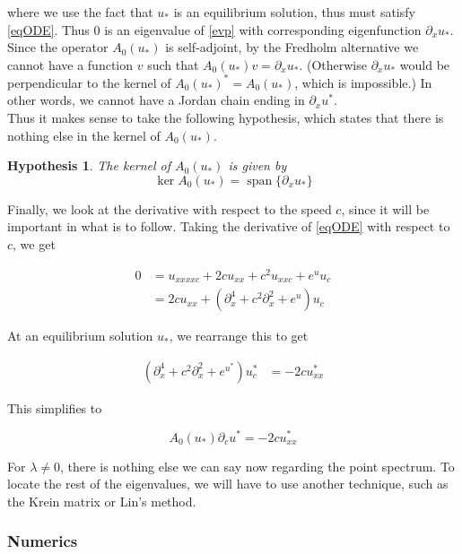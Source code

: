 \documentclass[12pt]{article}
\DeclareMathOperator{\spn}{span}
\newtheorem{hypothesis}{Hypothesis}
\begin{document}
where we use the fact that $u_*$ is an equilibrium solution, thus must satisfy \eqref{eqODE}. Thus 0 is an eigenvalue of \eqref{evp} with corresponding eigenfunction $\partial_x u_*$.\\

Since the operator $A_0(u_*)$ is self-adjoint, by the Fredholm alternative we cannot have a function $v$ such that $A_0(u_*) v = \partial_x u_*$. (Otherwise $\partial_x u_*$ would be perpendicular to the kernel of $A_0(u_*)^* = A_0(u_*)$, which is impossible.) In other words, we cannot have a Jordan chain ending in $\partial_x u^*$.\\

Thus it makes sense to take the following hypothesis, which states that there is nothing else in the kernel of $A_0(u_*)$.

\begin{hypothesis}\label{kerA0hyp}
The kernel of $A_0(u_*)$ is given by
\begin{equation}\label{kerA0}
\ker A_0(u_*) = \spn\{ \partial_x u_*\}
\end{equation}
\end{hypothesis}

Finally, we look at the derivative with respect to the speed $c$, since it will be important in what is to follow. Taking the derivative of \eqref{eqODE} with respect to $c$, we get

\begin{align*}
0 &= u_{xxxxc} + 2 c u_{xx} + c^2 u_{xxc} + e^{u} u_c \\
&= 2 c u_{xx} + (\partial_x^4 + c^2 \partial_x^2 + e^{u})u_c
\end{align*}

At an equilibrium solution $u_*$, we rearrange this to get

\begin{align*}
(\partial_x^4 + c^2 \partial_x^2 + e^{u^*})u^*_c &= -2 c u^*_{xx}
\end{align*}

This simplifies to 

\begin{equation}\label{uc}
A_0(u_*) \partial_c u^* = -2 c u^*_{xx}
\end{equation}

For $\lambda \neq 0$, there is nothing else we can say now regarding the point spectrum. To locate the rest of the eigenvalues, we will have to use another technique, such as the Krein matrix or Lin's method.

\subsubsection{Numerics}
\end{document}
